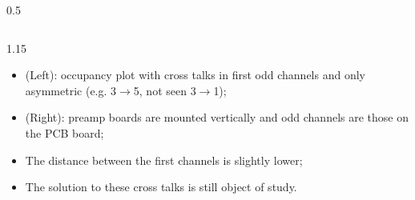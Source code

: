 \documentclass{beamer}
\begin{document}
\begin{frame}
\begin{columns}
\begin{column}{0.5\framewidth}
\end{column}
\end{columns}
\begin{columns}
\begin{column}{1.15\framewidth}
    \setlength{\leftmargini}{1.2em}
 \begin{itemize}
  \item (Left): occupancy plot with cross talks in first odd channels and only asymmetric (e.g. 3$\rightarrow$5, not seen 3$\rightarrow$1); 
\item (Right): preamp boards are mounted vertically and odd channels are those on the PCB board;
\item The distance between the first channels is slightly lower;
\item The solution to these cross talks is still object of study.
 \end{itemize}
\end{column}
\end{columns}
\end{frame}
\end{document}

